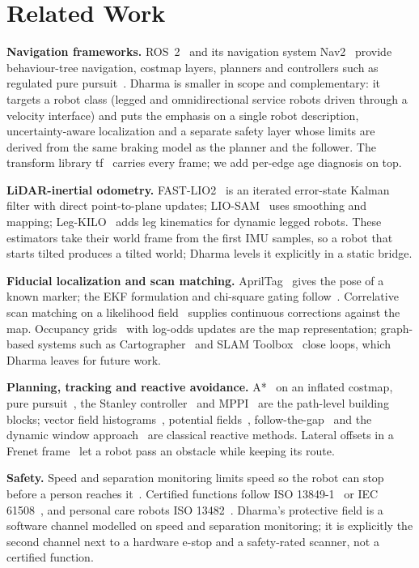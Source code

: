 \section{Related Work}
\label{sec:related}

\textbf{Navigation frameworks.} ROS~2~\cite{macenski2022ros2} and its navigation system
Nav2~\cite{macenski2020marathon2,macenski2023survey} provide behaviour-tree navigation,
costmap layers, planners and controllers such as regulated pure pursuit~\cite{macenski2023rpp}.
Dharma is smaller in scope and complementary: it targets a robot class (legged and
omnidirectional service robots driven through a velocity interface) and puts the emphasis on a
single robot description, uncertainty-aware localization and a separate safety layer whose
limits are derived from the same braking model as the planner and the follower. The transform
library tf~\cite{foote2013tf} carries every frame; we add per-edge age diagnosis on top.

\textbf{LiDAR-inertial odometry.} FAST-LIO2~\cite{xu2022fastlio2} is an iterated error-state
Kalman filter with direct point-to-plane updates; LIO-SAM~\cite{shan2020liosam} uses smoothing
and mapping; Leg-KILO~\cite{ou2024legkilo} adds leg kinematics for dynamic legged robots. These
estimators take their world frame from the first IMU samples, so a robot that starts tilted
produces a tilted world; Dharma levels it explicitly in a static bridge.

\textbf{Fiducial localization and scan matching.} AprilTag~\cite{olson2011apriltag,
wang2016apriltag2} gives the pose of a known marker; the EKF formulation and chi-square gating
follow~\cite{barshalom2001estimation,thrun2005probabilistic}. Correlative scan matching on a
likelihood field~\cite{olson2009csm} supplies continuous corrections against the map.
Occupancy grids~\cite{elfes1989occupancy} with log-odds updates are the map representation;
graph-based systems such as Cartographer~\cite{hess2016cartographer} and SLAM
Toolbox~\cite{macenski2021slamtoolbox} close loops, which Dharma leaves for future work.

\textbf{Planning, tracking and reactive avoidance.} A*~\cite{hart1968astar} on an inflated
costmap, pure pursuit~\cite{coulter1992purepursuit}, the Stanley
controller~\cite{thrun2006stanley} and MPPI~\cite{williams2017mppi} are the path-level
building blocks; vector field histograms~\cite{borenstein1991vfh}, potential
fields~\cite{khatib1986potential}, follow-the-gap~\cite{sezer2012ftg} and the dynamic window
approach~\cite{fox1997dwa} are classical reactive methods. Lateral offsets in a Frenet
frame~\cite{werling2010frenet} let a robot pass an obstacle while keeping its route.

\textbf{Safety.} Speed and separation monitoring limits speed so the robot can stop before a
person reaches it~\cite{isots15066,marvel2016ssm}. Certified functions follow ISO
13849-1~\cite{iso13849} or IEC 61508~\cite{iec61508}, and personal care robots
ISO 13482~\cite{iso13482}. Dharma's protective field is a software channel modelled on speed
and separation monitoring; it is explicitly the second channel next to a hardware e-stop and a
safety-rated scanner, not a certified function.
